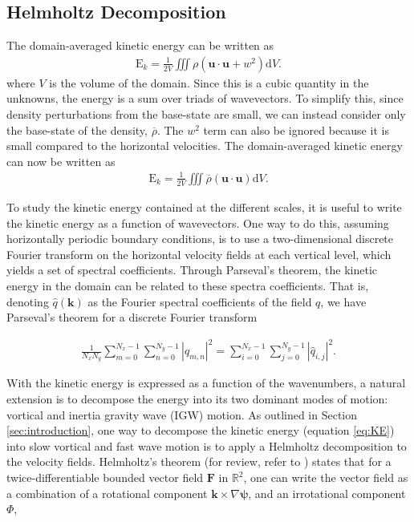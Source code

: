 \subsection{Helmholtz Decomposition}
\label{sec:helmholtz}
The domain-averaged kinetic energy can be written as 
\begin{align}
\text{E}_{k} = \frac{1}{2 V} \iiint \rho\left( \mathbf{u}\cdot \mathbf{u} + w^2\right) \text{d}V.
\end{align}
where $V$ is the volume of the domain. Since this is a cubic quantity in the unknowns, the energy is a sum over triads of wavevectors. To simplify this, since density perturbations from the base-state are small, we can instead consider only the base-state of the density, $\overline{\rho}$. The $w^2$ term can also be ignored because it is small compared to the horizontal velocities. The domain-averaged kinetic energy can now be written as
\begin{align}
\text{E}_{k} = \frac{1}{2V} \iiint \overline{\rho} \left(\mathbf{u}\cdot\mathbf{u}\right) \text{d}V. \label{eq:KE}
\end{align}

To study the kinetic energy contained at the different scales, it is useful to write the kinetic energy as a function of wavevectors. One way to do this, assuming horizontally periodic boundary conditions, is to use a two-dimensional discrete Fourier transform on the horizontal velocity fields at each vertical level, which yields a set of spectral coefficients. Through Parseval's theorem, the kinetic energy in the domain can be related to these spectra coefficients. That is, denoting $\widehat{q}(\mathbf{k})$ as the Fourier spectral coefficients of the field $q$, we have Parseval's theorem for a discrete Fourier transform

\begin{align}
 \frac{1}{N_x N_y} \sum_{m=0}^{N_x-1} \sum_{n=0}^{N_y-1} |q_{m,n}|^2 = \sum_{i=0}^{N_x-1}  \sum_{j=0}^{N_y-1} |\widehat{q}_{i,j}|^2.
\end{align}

With the kinetic energy is expressed as a function of the wavenumbers, a natural extension is to decompose the energy into its two dominant modes of motion: vortical and inertia gravity wave (IGW) motion. As outlined in Section \ref{sec:introduction}, one way to decompose the kinetic energy (equation \ref{eq:KE}) into slow vortical and fast wave motion is to apply a Helmholtz decomposition to the velocity fields. Helmholtz's theorem (for review, refer to \cite{Griffiths2013}) states that for a twice-differentiable bounded vector field $\mathbf{F}$ in $\mathbb{R}^2$, one can write the vector field as a combination of a rotational component $\mathbf{k} \times \nabla \mathbf{\psi}$, and an irrotational component $\Phi$,

